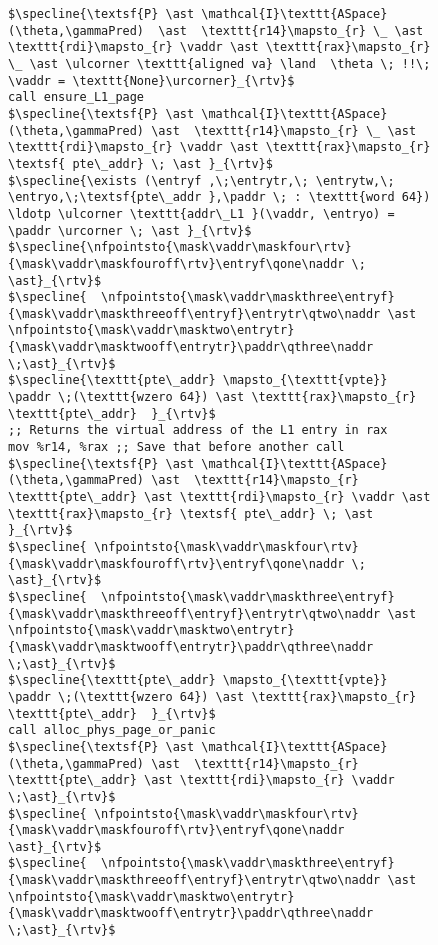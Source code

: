 \begin{figure}\footnotesize
  \begin{lstlisting}
$\specline{\textsf{P} \ast \mathcal{I}\texttt{ASpace}(\theta,\gammaPred)  \ast  \texttt{r14}\mapsto_{r} \_ \ast \texttt{rdi}\mapsto_{r} \vaddr \ast \texttt{rax}\mapsto_{r} \_ \ast \ulcorner \texttt{aligned va} \land  \theta \; !!\; \vaddr = \texttt{None}\urcorner}_{\rtv}$
call ensure_L1_page
$\specline{\textsf{P} \ast \mathcal{I}\texttt{ASpace}(\theta,\gammaPred) \ast  \texttt{r14}\mapsto_{r} \_ \ast \texttt{rdi}\mapsto_{r} \vaddr \ast \texttt{rax}\mapsto_{r} \textsf{ pte\_addr} \; \ast }_{\rtv}$
$\specline{\exists (\entryf ,\;\entrytr,\; \entrytw,\; \entryo,\;\textsf{pte\_addr },\paddr \; : \texttt{word 64}) \ldotp \ulcorner \texttt{addr\_L1 }(\vaddr, \entryo) = \paddr \urcorner \; \ast }_{\rtv}$
$\specline{\nfpointsto{\mask\vaddr\maskfour\rtv}{\mask\vaddr\maskfouroff\rtv}\entryf\qone\naddr \; \ast}_{\rtv}$ 
$\specline{  \nfpointsto{\mask\vaddr\maskthree\entryf}{\mask\vaddr\maskthreeoff\entryf}\entrytr\qtwo\naddr \ast \nfpointsto{\mask\vaddr\masktwo\entrytr}{\mask\vaddr\masktwooff\entrytr}\paddr\qthree\naddr \;\ast}_{\rtv}$
$\specline{\texttt{pte\_addr} \mapsto_{\texttt{vpte}} \paddr \;(\texttt{wzero 64}) \ast \texttt{rax}\mapsto_{r} \texttt{pte\_addr}  }_{\rtv}$
;; Returns the virtual address of the L1 entry in rax
mov %r14, %rax ;; Save that before another call
$\specline{\textsf{P} \ast \mathcal{I}\texttt{ASpace}(\theta,\gammaPred) \ast  \texttt{r14}\mapsto_{r} \texttt{pte\_addr} \ast \texttt{rdi}\mapsto_{r} \vaddr \ast \texttt{rax}\mapsto_{r} \textsf{ pte\_addr} \; \ast }_{\rtv}$
$\specline{ \nfpointsto{\mask\vaddr\maskfour\rtv}{\mask\vaddr\maskfouroff\rtv}\entryf\qone\naddr \; \ast}_{\rtv}$ 
$\specline{  \nfpointsto{\mask\vaddr\maskthree\entryf}{\mask\vaddr\maskthreeoff\entryf}\entrytr\qtwo\naddr \ast \nfpointsto{\mask\vaddr\masktwo\entrytr}{\mask\vaddr\masktwooff\entrytr}\paddr\qthree\naddr \;\ast}_{\rtv}$
$\specline{\texttt{pte\_addr} \mapsto_{\texttt{vpte}} \paddr \;(\texttt{wzero 64}) \ast \texttt{rax}\mapsto_{r} \texttt{pte\_addr}  }_{\rtv}$
call alloc_phys_page_or_panic
$\specline{\textsf{P} \ast \mathcal{I}\texttt{ASpace}(\theta,\gammaPred) \ast  \texttt{r14}\mapsto_{r} \texttt{pte\_addr} \ast \texttt{rdi}\mapsto_{r} \vaddr \;\ast}_{\rtv}$
$\specline{ \nfpointsto{\mask\vaddr\maskfour\rtv}{\mask\vaddr\maskfouroff\rtv}\entryf\qone\naddr \ast}_{\rtv}$ 
$\specline{  \nfpointsto{\mask\vaddr\maskthree\entryf}{\mask\vaddr\maskthreeoff\entryf}\entrytr\qtwo\naddr \ast \nfpointsto{\mask\vaddr\masktwo\entrytr}{\mask\vaddr\masktwooff\entrytr}\paddr\qthree\naddr \;\ast}_{\rtv}$

\end{lstlisting}
\end{figure}
